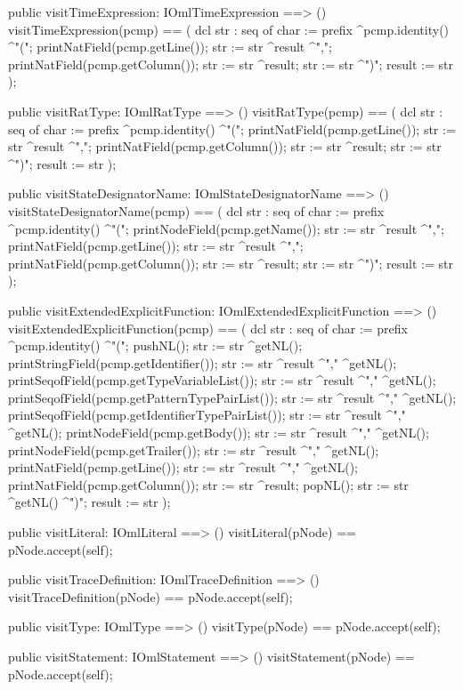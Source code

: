\begin{vdm_al}
  public visitTimeExpression: IOmlTimeExpression ==> ()
  visitTimeExpression(pcmp) ==
    ( dcl str : seq of char := prefix ^pcmp.identity() ^"(";
      printNatField(pcmp.getLine());
      str := str ^result ^",";
      printNatField(pcmp.getColumn());
      str := str ^result;
      str := str ^")";
      result := str );

  public visitRatType: IOmlRatType ==> ()
  visitRatType(pcmp) ==
    ( dcl str : seq of char := prefix ^pcmp.identity() ^"(";
      printNatField(pcmp.getLine());
      str := str ^result ^",";
      printNatField(pcmp.getColumn());
      str := str ^result;
      str := str ^")";
      result := str );

  public visitStateDesignatorName: IOmlStateDesignatorName ==> ()
  visitStateDesignatorName(pcmp) ==
    ( dcl str : seq of char := prefix ^pcmp.identity() ^"(";
      printNodeField(pcmp.getName());
      str := str ^result ^",";
      printNatField(pcmp.getLine());
      str := str ^result ^",";
      printNatField(pcmp.getColumn());
      str := str ^result;
      str := str ^")";
      result := str );

  public visitExtendedExplicitFunction: IOmlExtendedExplicitFunction ==> ()
  visitExtendedExplicitFunction(pcmp) ==
    ( dcl str : seq of char := prefix ^pcmp.identity() ^"(";
      pushNL();
      str := str ^getNL();
      printStringField(pcmp.getIdentifier());
      str := str ^result ^"," ^getNL();
      printSeqofField(pcmp.getTypeVariableList());
      str := str ^result ^"," ^getNL();
      printSeqofField(pcmp.getPatternTypePairList());
      str := str ^result ^"," ^getNL();
      printSeqofField(pcmp.getIdentifierTypePairList());
      str := str ^result ^"," ^getNL();
      printNodeField(pcmp.getBody());
      str := str ^result ^"," ^getNL();
      printNodeField(pcmp.getTrailer());
      str := str ^result ^"," ^getNL();
      printNatField(pcmp.getLine());
      str := str ^result ^"," ^getNL();
      printNatField(pcmp.getColumn());
      str := str ^result;
      popNL();
      str := str ^getNL() ^")";
      result := str );

  public visitLiteral: IOmlLiteral ==> ()
  visitLiteral(pNode) == pNode.accept(self);

  public visitTraceDefinition: IOmlTraceDefinition ==> ()
  visitTraceDefinition(pNode) == pNode.accept(self);

  public visitType: IOmlType ==> ()
  visitType(pNode) == pNode.accept(self);

  public visitStatement: IOmlStatement ==> ()
  visitStatement(pNode) == pNode.accept(self);


\end{vdm_al}
